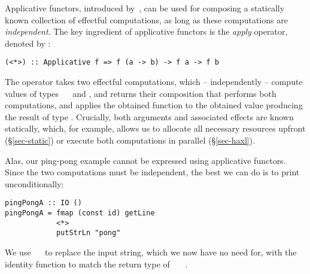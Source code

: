 Applicative functors, introduced by~\citet{mcbride2008applicative}, can be used
for composing a statically known collection of effectful computations, as long
as these computations are \emph{independent}. The key ingredient of applicative
functors is the \emph{apply} operator, denoted by \hs{<*>}:

\vspace{1mm}
\begin{verbatim}
(<*>) :: Applicative f => f (a -> b) -> f a -> f b
\end{verbatim}
\vspace{1mm}

\noindent
The operator takes two effectful computations, which -- independently -- compute
values of types ~\hs{->}~ and , and returns their composition
that performs both computations, and applies the obtained function to the
obtained value producing the result of type . Crucially, both arguments
and associated effects are known statically, which, for example, allows us to
allocate all necessary resources upfront (\S\ref{sec-static}) or execute both
computations in parallel (\S\ref{sec-haxl}).

Alas, our ping-pong example cannot be expressed using applicative functors.
Since the two computations must be independent, the best we can do is to print
 unconditionally:

\vspace{1mm}
\begin{verbatim}
pingPongA :: IO ()
pingPongA = fmap (const id) getLine
            <*>
            putStrLn "pong"
\end{verbatim}
\vspace{1mm}

\noindent
We use ~\hs{(}~ to replace the input string, which we
now have no need for, with the identity function to match the return type of
~\hs{::}~~\hs{()}.

